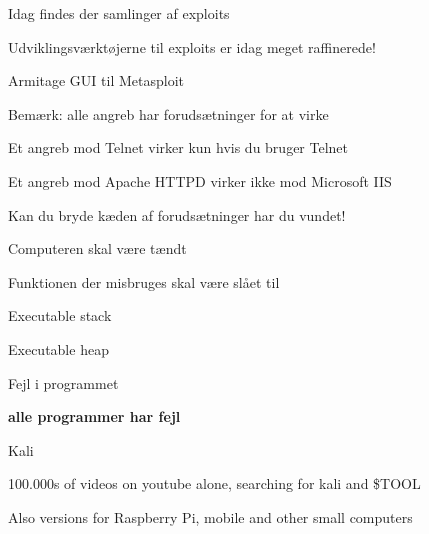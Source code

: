 \documentclass[Screen16to9,17pt]{foils}
\begin{document}




\begin{list1}
\item Idag findes der samlinger af exploits
\item Udviklingsværktøjerne til exploits er idag meget raffinerede!
\item {}
\item {} Armitage GUI til Metasploit
\item {}
\end{list1}



\begin{list1}
\item Bemærk: alle angreb har forudsætninger for at virke
\item Et angreb mod Telnet virker kun hvis du bruger Telnet
\item Et angreb mod Apache HTTPD virker ikke mod Microsoft IIS
\item Kan du bryde kæden af forudsætninger har du vundet!
\end{list1}



\begin{list1}
\item Computeren skal være tændt
\item Funktionen der misbruges skal være slået til
\item Executable stack
\item Executable heap
\item Fejl i programmet
\end{list1}
\pause
\vskip 2cm

\centerline{\color{titlecolor}\LARGE \bf alle programmer har fejl}




\begin{list1}
\item  Kali 
\item 100.000s of videos on youtube alone, searching for kali and \$TOOL
\item Also versions for Raspberry Pi, mobile and other small computers
\end{list1}
\end{document}
